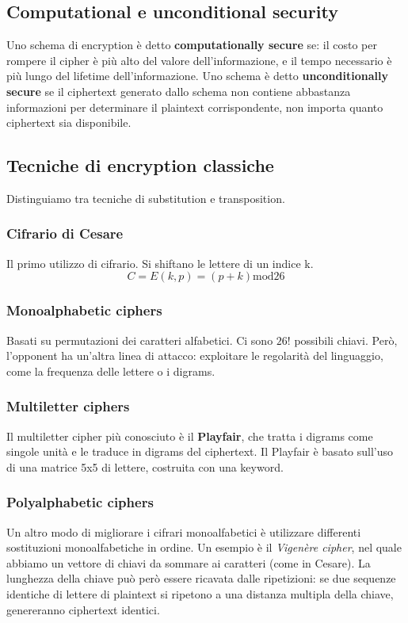 \documentclass[11pt]{article}
\begin{document}
\subsection{Computational e unconditional security}
Uno schema di encryption è detto \textbf{computationally secure} se: il costo per rompere il cipher è più alto del valore dell'informazione, e il tempo necessario è più lungo del lifetime dell'informazione. 
Uno schema è detto \textbf{unconditionally secure} se il ciphertext generato dallo schema non contiene abbastanza informazioni per determinare il plaintext corrispondente, non importa quanto ciphertext sia disponibile. 
\subsection{Tecniche di encryption classiche}
Distinguiamo tra tecniche di substitution e transposition. 
\subsubsection{Cifrario di Cesare}
Il primo utilizzo di cifrario. Si shiftano le lettere di un indice k.
\begin{displaymath}
    C = E(k,p) = (p+k) \textrm{mod}26
\end{displaymath}
\subsubsection{Monoalphabetic ciphers}
Basati su permutazioni dei caratteri alfabetici. Ci sono $26!$ possibili chiavi. Però, l'opponent ha un'altra linea di attacco: exploitare le regolarità del linguaggio, come la frequenza delle lettere o i digrams.
\subsubsection{Multiletter ciphers}
Il multiletter cipher più conosciuto è il \textbf{Playfair}, che tratta i digrams come singole unità e le traduce in digrams del ciphertext. Il Playfair è basato sull'uso di una matrice 5x5 di lettere, costruita con una keyword. 
\subsubsection{Polyalphabetic ciphers}
Un altro modo di migliorare i cifrari monoalfabetici è utilizzare differenti sostituzioni monoalfabetiche in ordine. Un esempio è il \textit{Vigenère cipher}, nel quale abbiamo un vettore di chiavi da sommare ai caratteri (come in Cesare). La lunghezza della chiave può però essere ricavata dalle ripetizioni: se due sequenze identiche di lettere di plaintext si ripetono a una distanza multipla della chiave, genereranno ciphertext identici. 
\end{document}
